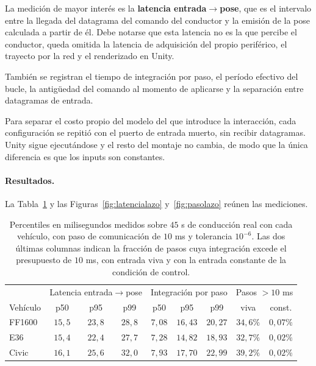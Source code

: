 La medición de mayor interés es la \textbf{latencia entrada$\rightarrow$pose}, que es el intervalo entre la llegada del datagrama del comando del conductor y la emisión de la pose calculada a partir de él. Debe notarse que esta latencia no es la que percibe el conductor, queda omitida la latencia de adquisición del propio periférico, el trayecto por la red y el renderizado en Unity.

También se registran el tiempo de integración por paso, el período efectivo del bucle, la antigüedad del comando al momento de aplicarse y la separación entre datagramas de entrada.

Para separar el costo propio del modelo del que introduce la interacción, cada configuración se repitió con el puerto de entrada muerto, sin recibir datagramas. Unity sigue ejecutándose y el resto del montaje no cambia, de modo que la única diferencia es que los inputs son constantes.


\paragraph{Resultados.} La Tabla~\ref{tab:lazo} y las Figuras~\ref{fig:latencialazo} y~\ref{fig:pasolazo} reúnen las mediciones.

\begin{table}[H]
\centering
\begin{tabular}{lccc|ccc|cc}
\hline
 & \multicolumn{3}{c}{Latencia entrada$\rightarrow$pose} & \multicolumn{3}{c}{Integración por paso} & \multicolumn{2}{c}{Pasos $>10$ ms} \\
Vehículo & p50 & p95 & p99 & p50 & p95 & p99 & viva & const. \\
\hline
FF1600 & $15{,}5$ & $23{,}8$ & $28{,}8$ & $7{,}08$ & $16{,}43$ & $20{,}27$ & $34{,}6\%$ & $0{,}07\%$ \\
E36    & $15{,}4$ & $22{,}4$ & $27{,}7$ & $7{,}28$ & $14{,}82$ & $18{,}93$ & $32{,}7\%$ & $0{,}02\%$ \\
Civic  & $16{,}1$ & $25{,}6$ & $32{,}0$ & $7{,}93$ & $17{,}70$ & $22{,}99$ & $39{,}2\%$ & $0{,}02\%$ \\
\hline
\end{tabular}
\caption[Perfil del lazo cerrado en tiempo real]{Percentiles en milisegundos medidos sobre $45$ s de conducción real con cada vehículo, con paso de comunicación de $10$ ms y tolerancia $10^{-6}$. Las dos últimas columnas indican la fracción de pasos cuya integración excede el presupuesto de $10$ ms, con entrada viva y con la entrada constante de la condición de control.}
\label{tab:lazo}
\end{table}

